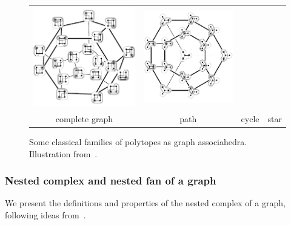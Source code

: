 \documentclass{amsart}
\theoremstyle{definition}
\begin{document}
\begin{figure}[t]
{\begin{tabular}{c@{\;}c@{\;}c@{\;}c}
			\includegraphics[scale=.6]{cyclohedronTubings} &
			\includegraphics[scale=.6]{stellohedronTubings} \\[.1cm]
			complete graph &
			path &
			cycle &
			star
		\end{tabular}
	}
	\caption{Some classical families of polytopes as graph associahedra. Illustration from~\cite{MannevillePilaud-compatibilityFans}.}
	\label{fig:specialGraphAssociahedra}
\end{figure}

\subsubsection{Nested complex and nested fan of a graph}

We present the definitions and properties of the nested complex of a graph, following ideas from~\cite{CarrDevadoss, Postnikov, FeichtnerSturmfels, Zelevinsky}.
\end{document}
